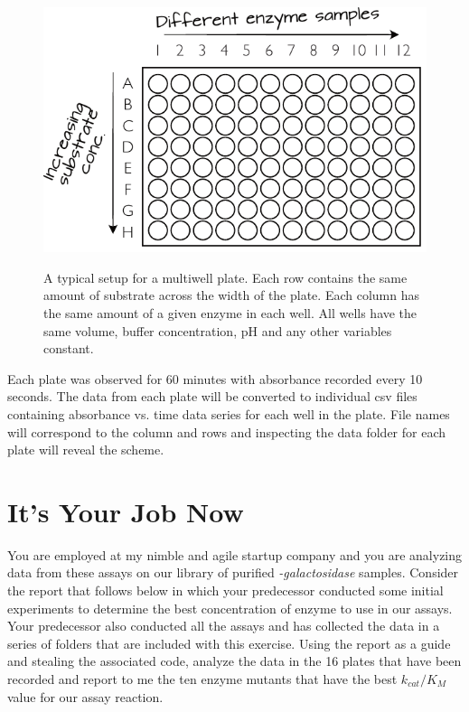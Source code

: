 \documentclass[]{tufte-handout}
\begin{document}
\begin{figure}[h!]

  \caption[0mm]{A typical setup for a multiwell plate. Each row contains the same amount of substrate across the width of the plate. Each column has the same amount of a given enzyme in each well. All wells have the same volume, buffer concentration, pH and any other variables constant.} 
  \vspace{2mm}
    \centering
  \includegraphics[scale=0.7]{Microtitreplatediagram.pdf}
  \vspace{2mm}
  \label{fig:fig4}
\end{figure}


Each plate was observed for 60 minutes with absorbance recorded every 10 seconds. The data from each plate will be converted to individual csv files containing absorbance vs. time data series for each well in the plate. File names will correspond to the column and rows and inspecting the data folder for each plate will reveal the scheme.

\section{It's Your Job Now}

You are employed at my nimble and agile startup company and you are analyzing data from these assays on our library of purified \emph{\textbeta -galactosidase} samples. Consider the report that follows below in which your predecessor conducted some initial experiments to determine the best concentration of enzyme to use in our assays. Your predecessor also conducted all the assays and has collected the data in a series of folders that are included with this exercise. Using the report as a guide and stealing the associated code, analyze the data in the 16 plates that have been recorded and report to me the ten enzyme mutants that have the best $k_{cat}/K_M$ value for our assay reaction. 
\end{document}
